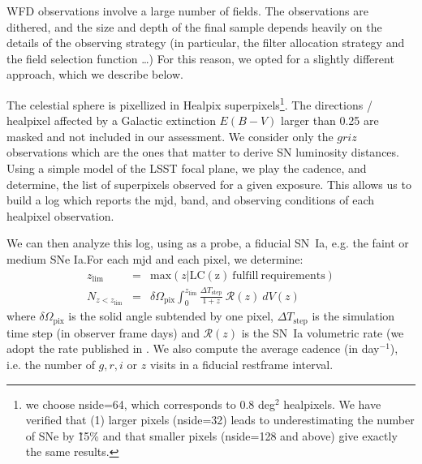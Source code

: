 \documentclass[a4paper,10pt]{article}
\newcommand{\sne}{{SNe Ia}}
\begin{document}
WFD observations involve a large number of fields.  The observations
are dithered, and the size and depth of the final sample depends
heavily on the details of the observing strategy (in particular, the
filter allocation strategy and the field selection function \ldots)
For this reason, we opted for a slightly different approach, which we
describe below.

The celestial sphere is pixellized in Healpix superpixels\footnote{we
  choose nside=64, which corresponds to 0.8 deg$^2$ healpixels.  We
  have verified that (1) larger pixels (nside=32) leads to
  underestimating the number of SNe by \~15\% and
  that smaller pixels (nside=128 and above) give exactly the same
  results.}.  The directions / healpixel affected by a Galactic extinction $E(B-V)$ larger than 0.25
are masked and not included in our assessment. We consider only the $griz$ observations which are the ones
that matter to derive SN luminosity distances. 
Using a simple model of the LSST focal plane, we play
the cadence, and determine, the list of superpixels observed for a
given exposure. This allows us to build a log which reports the mjd,
band, and observing conditions of each healpixel observation.

We can then analyze this log, using as a probe, a fiducial SN~Ia,
e.g. the faint or medium \sne.For each mjd and each pixel, we determine:
\begin{eqnarray}
  z_{\mathrm{lim}} & = & \mathrm{max}\left(z | \mathrm{LC(z)\ fulfill\ requirements}\right) \\
  N_{z<z_{\mathrm{lim}}} &= & \delta\Omega_{\mathrm{pix}} \int_0^{z_\mathrm{lim}} \frac{\Delta T_{\mathrm{step}}}{1+z}\ {\mathcal{R}}(z)\ dV(z)
\end{eqnarray}
where $\delta\Omega_{\mathrm{pix}}$ is the solid angle subtended by
one pixel, $\Delta T_{\mathrm{step}}$ is the simulation time step (in
observer frame days) and $\mathcal{R}(z)$ is the SN~Ia volumetric rate
(we adopt the rate published in \cite{perrett}.  We also
compute the average cadence (in day$^{-1}$), i.e. the number of $g, r,
i$ or $z$ visits in a fiducial restframe interval.
\end{document}

